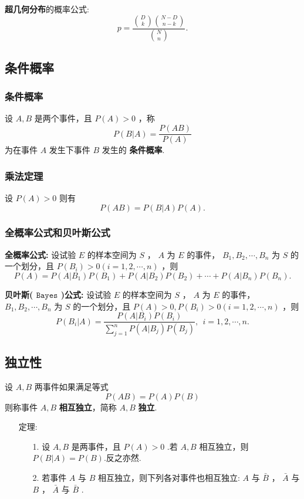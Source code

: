 \documentclass[UTF8,10pt]{ctexart}
\begin{document}
	\textbf{超几何分布}的概率公式: $$ p= \frac{ \binom{D}{k} \binom{N-D}{n-k} }{ \binom{N}{n} }. $$ 
	
	\subsection{条件概率}
	
	\subsubsection{条件概率}
	
	设 $ A,B $ 是两个事件，且 $ P(A)>0 $ ，称 $$ P(B|A)= \frac{P(AB)}{P(A)} $$ 为在事件 $ A $ 发生下事件 $ B $ 发生的 \textbf{条件概率}.
	
	\subsubsection{乘法定理}
	
	设 $ P(A)>0 $ 则有 $$ P(AB)=P(B|A)P(A). $$ 
	
	\subsubsection{全概率公式和贝叶斯公式}
	
	\textbf{全概率公式:} 设试验 $ E $ 的样本空间为 $ S $ ， $ A $ 为 $ E $ 的事件， $ B_{1},B_{2}, \cdots ,B_{n} $ 为 $ S $ 的一个划分，且 $ P(B_{i})>0(i=1,2, \cdots ,n) $ ，则 $$ P(A)=P(A|B_{1})P(B_{1})+P(A|B_{2})P(B_{2})+ \cdots +P(A|B_{n})P(B_{n}). $$ 
	
	\textbf{贝叶斯( $ \texttt{Bayes} $ )公式:} 设试验 $ E $ 的样本空间为 $ S $ ， $ A $ 为 $ E $ 的事件， $ B_{1},B_{2}, \cdots ,B_{n} $ 为 $ S $ 的一个划分，且 $ P(A)>0,P(B_{i})>0(i=1,2, \cdots ,n) $ ，则 $$ P(B_{i}|A)= \frac{P(A|B_{i})P(B_{i})}{\sum\limits_{j=1}^{n}P(A|B_{j})P(B_{j})},\ \ i=1,2, \cdots ,n. $$ 
	
	\subsection{独立性}
	
	设 $ A,B $ 两事件如果满足等式 $$ P(AB)=P(A)P(B) $$ 则称事件 $ A,B $ \textbf{相互独立}，简称 $ A,B $ \textbf{独立}.
	
	\begin{itemize}
		\item [定理:] {
			\begin{enumerate}
				\item [1.] 设 $ A,B $ 是两事件，且 $ P(A)>0 $ .若 $ A,B $ 相互独立，则 $ P(B|A)=P(B) $.反之亦然.
				\item [2.] 若事件 $ A $ 与 $ B $ 相互独立，则下列各对事件也相互独立: $ A $ 与 $ \bar{B} $ ， $ \bar{A} $ 与 $ B $ ， $ \bar{A} $ 与 $ \bar{B} $ .
			\end{enumerate}
		}
	\end{itemize}
	
\end{document}
